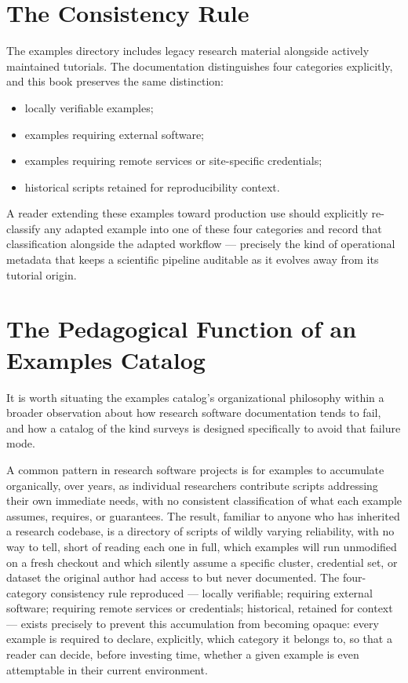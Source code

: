 \section{The Consistency Rule}

The examples directory includes legacy research material alongside actively
maintained tutorials. The documentation distinguishes four categories
explicitly, and this book preserves the same distinction:

\begin{itemize}[leftmargin=1.4em]
  \item locally verifiable examples;
  \item examples requiring external software;
  \item examples requiring remote services or site-specific credentials;
  \item historical scripts retained for reproducibility context.
\end{itemize}

\begin{cautionbox}
A reader extending these examples toward production use should explicitly
re-classify any adapted example into one of these four categories and record
that classification alongside the adapted workflow --- precisely the kind of
operational metadata that keeps a scientific pipeline auditable as it
evolves away from its tutorial origin.
\end{cautionbox}

\section{The Pedagogical Function of an Examples Catalog}

It is worth situating the examples catalog's organizational philosophy
within a broader observation about how research software documentation
tends to fail, and how a catalog of the kind 
surveys is designed specifically to avoid that failure mode.

A common pattern in research software projects is for examples to
accumulate organically, over years, as individual researchers contribute
scripts addressing their own immediate needs, with no consistent
classification of what each example assumes, requires, or guarantees. The
result, familiar to anyone who has inherited a research codebase, is a
directory of scripts of wildly varying reliability, with no way to tell,
short of reading each one in full, which examples will run unmodified on a
fresh checkout and which silently assume a specific cluster, credential set,
or dataset the original author had access to but never documented. The
four-category consistency rule  reproduced ---
locally verifiable; requiring external software; requiring remote
services or credentials; historical, retained for context --- exists
precisely to prevent this accumulation from becoming opaque: every example
is required to declare, explicitly, which category it belongs to, so that a
reader can decide, before investing time, whether a given example is even
attemptable in their current environment.

